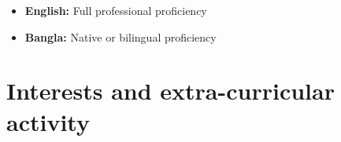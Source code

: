 \documentclass[11pt,a4paper,sans]{moderncv}        %
\begin{document}
\vspace{6pt}

\begin{itemize}

\item \textbf{English:} Full professional proficiency

\vspace{6pt}

\item \textbf{Bangla:} Native or bilingual proficiency

\end{itemize}

\section{Interests and extra-curricular activity}

\vspace{6pt}
\end{document}
